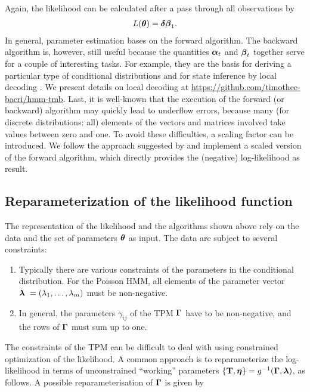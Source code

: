 \documentclass[bimj,fleqn]{w-art}\usepackage[]{graphicx}\usepackage[]{color}
\newcommand{\bct}{{\bf T}}
\newcommand{\bgamma}{\mbox{\boldmath $\Gamma$}}
\newcommand{\bfeta}{\mbox{\boldmath $\eta$}}
\newcommand{\btheta}{\mbox{\boldmath $\theta$}}
\newcommand{\balpha}{\mbox{\boldmath $\alpha$}}
\newcommand{\bfbeta}{\mbox{\boldmath $\beta$}}
\newcommand{\bfdelta}{\mbox{\boldmath $\delta$}}
\newcommand{\bflambda}{\mbox{\boldmath $\lambda$}}
\theoremstyle{plain}
\theoremstyle{definition}
\begin{document}
Again, the likelihood can be calculated after a pass through all observations by
\begin{gather*}
L(\btheta) = \bfdelta \bfbeta_1.
\end{gather*}
In general, parameter estimation bases on the forward algorithm.
The backward algorithm is, however, still useful because the quantities $\balpha_t$ and $\bfbeta_t$ together serve for a couple of interesting tasks.
For example, they are the basis for deriving a particular type of conditional distributions and for state inference by local decoding \cite[Ch.~5, pp.~81-93]{zucchini}. We present details on local decoding at \underline{\url{https://github.com/timothee-bacri/hmm-tmb}}.
Last, it is well-known that the execution of the forward (or backward) algorithm may quickly lead to underflow errors, because many (for discrete distributions: all) elements of the vectors and matrices involved take values between zero and one.
To avoid these difficulties, a scaling factor can be introduced.
We follow the approach suggested by \citet[p. ~48]{zucchini} and implement a scaled version of the forward algorithm, which directly provides the (negative) log-likelihood as result.


\subsection{Reparameterization of the likelihood function}
\label{sec:hmm_repar}

The representation of the likelihood and the algorithms shown above rely on the data and the set of parameters $\btheta$ as input. The data are subject to several constraints:
\begin{enumerate}
\item Typically there are various constraints of the parameters in the conditional distribution. For the Poisson HMM, all elements of the parameter vector $\bflambda\ = (\lambda_1, \dots, \lambda_m)$ must be non-negative. 
\item In general, the parameters $\gamma_{ij}$ of the TPM $\bgamma$ have to be non-negative, and the rows of $\bgamma$ must sum up to one.
\end{enumerate}
The constraints of the TPM can be difficult to deal with using constrained optimization of the likelihood. A common approach is to reparameterize the log-likelihood in terms of unconstrained ``working'' parameters $\{\bct, \bfeta\}= g^{-1}(\bgamma, \bflambda)$, as follows. A possible reparameterisation of $\bgamma$ is given by 
\end{document}
